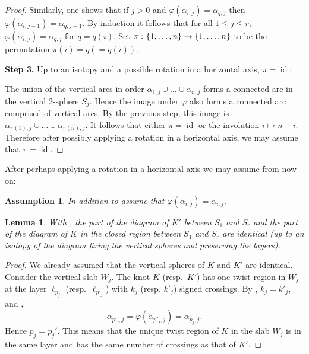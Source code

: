 \documentclass[12pt,reqno]{amsart}
\theoremstyle{plain}
\newtheorem{lemma}[theorem]{Lemma}
\newtheorem{assumption}[theorem]{Assumption}
\theoremstyle{definition}
\def\from{\thinspace\colon}
\DeclareMathOperator{\id}{id}
\begin{document}
\begin{proof}
Similarly, one shows that if $j>0$ and $\varphi (\alpha_{i,j}) = \alpha_{q,j}$ 
then $\varphi(\alpha_{i,j-1})=\alpha_{q,j-1}$.  By induction it follows that for 
all $1\le j \le r$, $\varphi(\alpha_{i,j})=\alpha_{q,j}$ for $q=q(i)$.
\vskip7pt
Set $\pi\from \{1,\dots,n\}\to \{1,\dots,n\}$ to be the permutation $\pi(i)=q (= q(i))$.

\vskip7pt

\textbf{Step 3.} Up to an isotopy and a possible 
rotation in a horizontal axis, $\pi = \id$:

The union of the vertical arcs in order $\alpha_{1,j} \cup \dots \cup \alpha_{n,j}$ 
forms a connected arc in the vertical 2-sphere $S_j$. Hence the image 
under $\varphi$ also forms a connected arc comprised of vertical arcs. By the 
previous step, this image is $\alpha_{\pi(1),j} \cup \dots \cup \alpha_{\pi(n),j}$. 
It follows that either $\pi = \id$ or the involution $i\mapsto n-i$.
Therefore after possibly applying a rotation in a 
horizontal axis, we may assume that $\pi=\id$.
\end{proof}

After perhaps applying a rotation in a horizontal axis we may assume 
from now on:
\begin{assumption}\label{Assump:FlipHorizontal}
In addition to  assume that $\varphi(\alpha_{i,j})=\alpha_{i,j}$.
\end{assumption}

\begin{lemma}
With ,
    the part of the diagram of $K'$ between $S_1$ and $S_r$ and the part of 
    the diagram of $K$ in the closed region between $S_1$ and $S_r$ are 
    identical (up to an isotopy of the diagram fixing the vertical spheres and 
    preserving the layers).
\end{lemma}

\begin{proof}
We already assumed that the vertical spheres of $K$ and $K'$ are identical. 
Consider the vertical slab $W_j$. The knot $K$ (resp.\ $K'$) has one twist 
region in $W_j$ at the layer $\ell_{p_j}$ (resp.\ $\ell_{p'_j}$) with $k_j$ 
(resp. $k'_j$) signed crossings. By , 
$k_j = k'_j$, and , $$\alpha_{p'_j,j}=\varphi(\alpha_{p'_j,j}) = 
\alpha_{p_j,j}.$$ Hence $p_j = p_j'$. This means that the unique twist region of 
$K$ in the slab $W_j$ is in the same layer and has the same number of  crossings 
as that of $K'$.
\end{proof}
\end{document}
